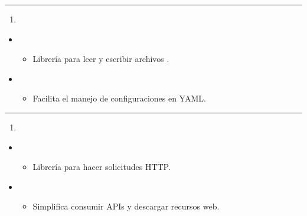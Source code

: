 \documentclass[a4paper,10pt,oneside,spanish,openany]{sphinxmanual}
\begin{document}
\bigskip\hrule\bigskip

\begin{enumerate}
%
\setcounter{enumi}{24}
\item {} 
\sphinxAtStartPar
{}

\end{enumerate}
\begin{itemize}
\item {} 
\sphinxAtStartPar
{}
\begin{itemize}
\item {} 
\sphinxAtStartPar
Librería para leer y escribir archivos .

\end{itemize}

\item {} 
\sphinxAtStartPar
{}
\begin{itemize}
\item {} 
\sphinxAtStartPar
Facilita el manejo de configuraciones en YAML.

\end{itemize}

\end{itemize}


\bigskip\hrule\bigskip

\begin{enumerate}
%
\setcounter{enumi}{25}
\item {} 
\sphinxAtStartPar
{}

\end{enumerate}
\begin{itemize}
\item {} 
\sphinxAtStartPar
{}
\begin{itemize}
\item {} 
\sphinxAtStartPar
Librería para hacer solicitudes HTTP.

\end{itemize}

\item {} 
\sphinxAtStartPar
{}
\begin{itemize}
\item {} 
\sphinxAtStartPar
Simplifica consumir APIs y descargar recursos web.

\end{itemize}

\end{itemize}
\end{document}
